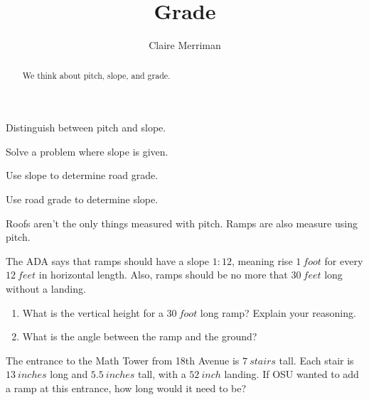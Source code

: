 \documentclass[noauthor,nooutcomes,hints,handout]{ximera}
\title{Grade}
\author{Claire Merriman}
\begin{document}
\begin{abstract}
  We think about pitch, slope, and grade.
\end{abstract}
\maketitle

\begin{listOutcomes}
\item Distinguish between pitch and slope.
\item Solve a problem where slope is given.
\item Use slope to determine road grade.
\item Use road grade to determine slope.
\end{listOutcomes}
\mynewpage

\begin{question}
  Roofs aren't the only things measured with pitch. Ramps are also measure using pitch. 
  
  The ADA says that ramps should have a slope $1:12$, meaning rise $1 \ foot$ for every $12\ feet$ in horizontal length. Also, ramps should be no more that $30\ feet$ long without a landing. 
  
  
\begin{enumerate}
 \item What is the vertical height for a $30\ foot$ long ramp? Explain your reasoning. 
 \item What is the angle between the ramp and the ground?
\end{enumerate}

\end{question}

\mynewpage

\begin{question}
The entrance to the Math Tower from 18th Avenue is $7\ stairs$ tall. Each stair is $13\ inches$ long and $5.5\ inches$ tall, with a $52\ inch$ landing. If OSU wanted to add a ramp at this entrance, how long would it need to be?

  \end{question}
\mynewpage
\end{document}
